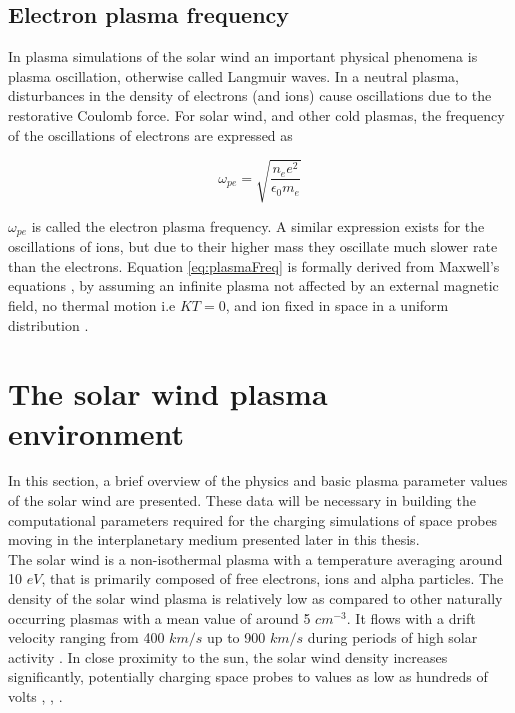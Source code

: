 \subsection{Electron plasma frequency}
In plasma simulations of the solar wind an important physical phenomena is plasma oscillation, otherwise called Langmuir waves. In a neutral plasma, disturbances in the density of electrons (and ions) cause oscillations due to the restorative Coulomb force. For solar wind, and other cold plasmas, the frequency of the oscillations of electrons are expressed as

\begin{equation}\label{eq:plasmaFreq}
    \omega_{pe} = \sqrt{\frac{n_e e^2}{\epsilon_0 m_e}}
\end{equation}

$\omega_{pe}$ is called the electron plasma frequency. A similar expression exists for the oscillations of ions, but due to their higher mass they oscillate much slower rate than the electrons. Equation \eqref{eq:plasmaFreq} is formally derived from Maxwell's equations \parencite{Fitzpatrick2015}, \parencite{HutchinsonIanH2002Popd} by assuming an infinite plasma not affected by an external magnetic field, no thermal motion i.e $KT = 0$, and ion fixed in space  in a uniform distribution \parencite[Section 4.3]{Chen2018}.



\section{The solar wind plasma environment}
In this section, a brief overview of the physics and basic plasma parameter values of the solar wind are presented. These data will be necessary in building the computational parameters required for the charging simulations of space probes moving in the interplanetary medium presented later in this thesis.
\\
The solar wind is a non-isothermal plasma with a temperature averaging around 10 $eV$, that is primarily composed of free electrons, ions and alpha particles. The density of the solar wind plasma is relatively low as compared to other naturally occurring plasmas with a mean value of around 5 $cm^{-3}$. It flows with a drift velocity ranging from 400 $km/s$ up to 900 $km/s$ during periods of high solar activity \parencite{LAI2019}. In close proximity to the sun, the solar wind density increases significantly, potentially charging space probes to values as low as hundreds of volts \parencite{LAI2019}, \parencite{Deca2013}, \parencite{Garrett1981}.


